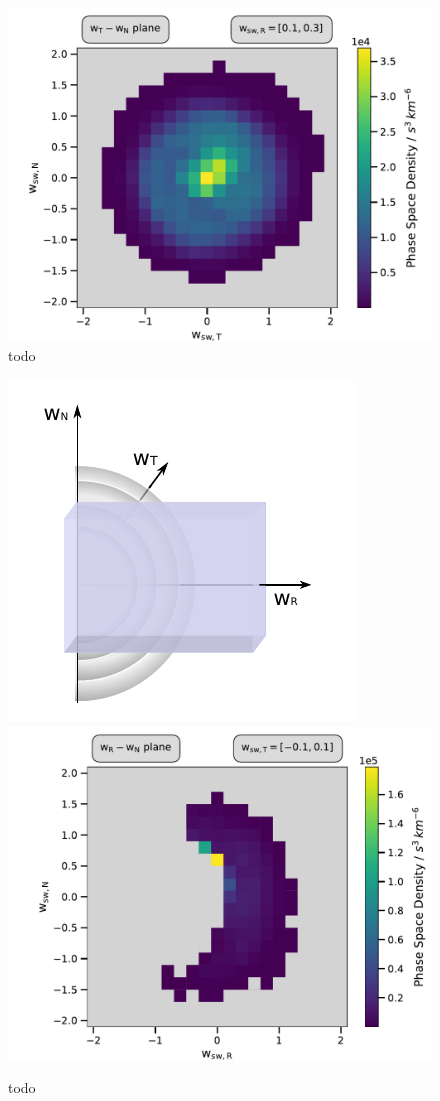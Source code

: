 \begin{figure}[h]
	\includegraphics[width=.8\textwidth]{Figures/cart_lang_R_psd.pdf}
	\centering
	\caption{todo}
	\label{fig:psd_lang}
\end{figure}






\begin{figure}[h]
	\includegraphics[width=.4\textwidth]{Figures/slice_T2.pdf}
	\includegraphics[scale=.45]{Figures/slice_psd_T.pdf}
	\centering
	\caption{todo}
	\label{fig:sketch_slice_T}
\end{figure}

